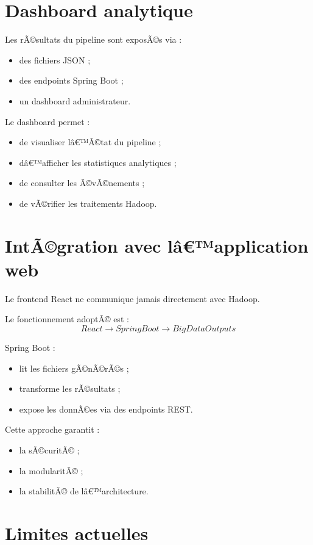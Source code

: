 ﻿\documentclass[12pt,a4paper]{report}
\begin{document}
\section{Dashboard analytique}

Les rÃ©sultats du pipeline sont exposÃ©s via :
\begin{itemize}
    \item des fichiers JSON ;
    \item des endpoints Spring Boot ;
    \item un dashboard administrateur.
\end{itemize}

Le dashboard permet :
\begin{itemize}
    \item de visualiser lâ€™Ã©tat du pipeline ;
    \item dâ€™afficher les statistiques analytiques ;
    \item de consulter les Ã©vÃ©nements ;
    \item de vÃ©rifier les traitements Hadoop.
\end{itemize}

\section{IntÃ©gration avec lâ€™application web}

Le frontend React ne communique jamais directement avec Hadoop.

Le fonctionnement adoptÃ© est :
\[
React \rightarrow Spring Boot \rightarrow BigDataOutputs
\]

Spring Boot :
\begin{itemize}
    \item lit les fichiers gÃ©nÃ©rÃ©s ;
    \item transforme les rÃ©sultats ;
    \item expose les donnÃ©es via des endpoints REST.
\end{itemize}

Cette approche garantit :
\begin{itemize}
    \item la sÃ©curitÃ© ;
    \item la modularitÃ© ;
    \item la stabilitÃ© de lâ€™architecture.
\end{itemize}

\section{Limites actuelles}
\end{document}
